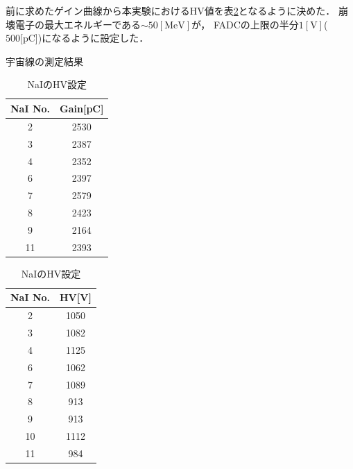 前に求めたゲイン曲線から本実験におけるHV値を表\ref{HV}となるように決めた．
崩壊電子の最大エネルギーである$\sim 50[\mathrm{MeV}]$が， FADCの上限の半分$1[\mathrm{V}]$($500[\mathrm{pC}$])になるように設定した．
\begin{table}[H]
  \begin{minipage}[t]{0.45\textwidth}
    \begin{center}
    \caption{宇宙線の測定結果}\label{nai_gain}
      \begin{tabular}{|c|c|}\hline
        NaI No. & Gain[pC]\\ \hline \hline
        2 & 2530 \\ \hline
        3 &2387 \\ \hline
        4 &2352 \\ \hline
        6 &2397 \\ \hline
        7  &2579 \\ \hline
        8  &2423 \\ \hline
        9  &2164 \\ \hline
        11  &2393 \\ \hline
      \end{tabular}
    \end{center}
  \end{minipage}
  \hfill
  \begin{minipage}[t]{0.45\textwidth}
    \begin{center}
    \caption{NaIのHV設定}\label{HV}
      \begin{tabular}{|c|c|}\hline
      NaI No.&HV[V]\\ \hline \hline
      2 & 1050 \\ \hline
      3 & 1082 \\ \hline
      4 & 1125 \\ \hline
      6 & 1062 \\ \hline
      7 & 1089 \\ \hline
      8 & 913 \\ \hline
      9 & 913 \\ \hline
      10 & 1112 \\ \hline
      11 & 984 \\ \hline
      \end{tabular}
    \end{center}
  \end{minipage}
\end{table}


